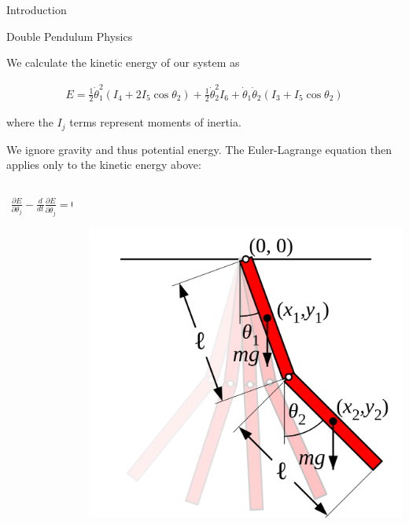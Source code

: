 \documentclass[final]{beamer}
\begin{document}
\begin{frame}{}
{\begin{columns}[t]
\begin{column}{.30\linewidth}
\begin{block}{\centering Introduction}
\end{block}
                
                

\begin{block}{\centering Double Pendulum Physics} 

We calculate the kinetic energy of our system as
	
\begin{align*}
	E = \frac{1}{2}\dot\theta_1^2(I_4 + 2I_5\cos\theta_2)
	+ \frac{1}{2}\dot\theta_2^2I_6
	+ \dot\theta_1\dot\theta_2(I_3 + I_5 \cos\theta_2)
\end{align*}

where the $I_j$ terms represent moments of inertia. 

We ignore gravity and thus potential energy. The Euler-Lagrange equation then applies
only to the kinetic energy above:

\begin{columns}[T]
\begin{column}{16cm}{}
\begin{align*}
\frac{\partial E}{\partial \theta_j} - 
\frac{d}{dt}\frac{\partial E}{\partial \dot{\theta_j}} = 0
\end{align*}
\end{column}
\begin{column}{16cm}{}
\centering\includegraphics[height=12cm, width = 12cm]{figures/double-pendulum.png}\\
\end{column}


\end{columns}
\end{block}
\end{column}
\end{columns}}
\end{frame}
\end{document}
